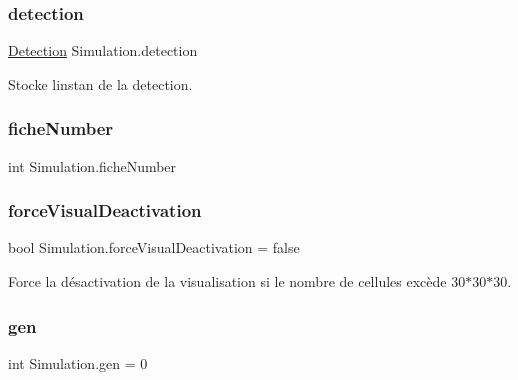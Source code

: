 \subsubsection{\texorpdfstring{detection}{detection}}
{\footnotesize\ttfamily \mbox{\hyperlink{class_detection}{Detection}} Simulation.\+detection\hspace{0.3cm}{\ttfamily [private]}}



Stocke l\textquotesingle{}instan de la detection. 

\mbox{\label{class_simulation_a4fd8bb7eb15c0462da5f0615d293e404}} 
\subsubsection{\texorpdfstring{fiche\+Number}{ficheNumber}}
{\footnotesize\ttfamily int Simulation.\+fiche\+Number}

\mbox{\label{class_simulation_a8fd619d4dd151c7eed091395f794af25}} 
\subsubsection{\texorpdfstring{force\+Visual\+Deactivation}{forceVisualDeactivation}}
{\footnotesize\ttfamily bool Simulation.\+force\+Visual\+Deactivation = false\hspace{0.3cm}{\ttfamily [private]}}



Force la désactivation de la visualisation si le nombre de cellules excède 30$\ast$30$\ast$30. 

\mbox{\label{class_simulation_a5d6130f94a3799a582363321183df42d}} 
\subsubsection{\texorpdfstring{gen}{gen}}
{\footnotesize\ttfamily int Simulation.\+gen = 0\hspace{0.3cm}{\ttfamily [private]}}



